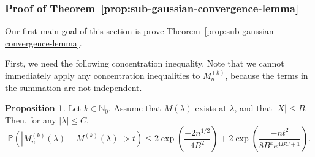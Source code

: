 \documentclass{article}
\theoremstyle{definition}
\newtheorem{proposition}{Proposition}
\newcommand{\N}{\mathbb{N}}
\newcommand{\1}{\mathbbm{1}}
\renewcommand{\P}{\mathbb{P}}
\begin{document}
\subsubsection{Proof of Theorem~\ref{prop:sub-gaussian-convergence-lemma}}
Our first main goal of this section is prove Theorem~\ref{prop:sub-gaussian-convergence-lemma}. 

First, we need the following concentration inequality. Note that we cannot immediately apply any concentration inequalities to $M_n^{(k)}$, because the terms in the summation are not independent. 
\begin{proposition}
\label{propn:mgf-concentration-ineq}
    Let $k \in \N_0$. Assume that $M(\lambda)$ exists at $\lambda$, and that $|X| \leq B$. Then, for any $|\lambda| \leq C$, 
    \[
    \P\left(|M_n^{(k)}(\lambda) - M^{(k)}(\lambda)| > t\right) \leq 2\exp\left(\frac{-2n^{1/2}}{4B^2}\right) + 2\exp\left(\frac{-nt^2}{8B^ke^{4BC+1}}\right).
    \]
\end{proposition}
\end{document}
